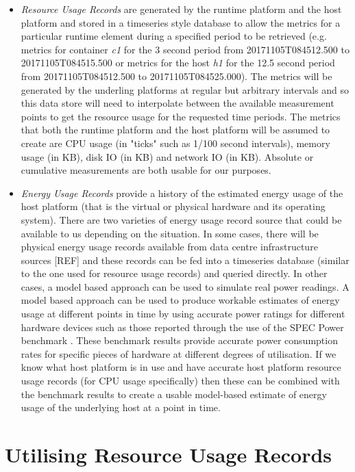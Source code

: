 \begin{itemize}
\item \emph{Resource Usage Records} are generated by the runtime platform and the host platform and stored in a timeseries style database to allow the metrics for a particular runtime element during a specified period to be retrieved (e.g. metrics for container \emph{c1} for the 3 second period from 20171105T084512.500 to 20171105T084515.500 or metrics for the host \emph{h1} for the 12.5 second period from 20171105T084512.500 to 20171105T084525.000).  The metrics will be generated by the underling platforms at regular but arbitrary intervals and so this data store will need to interpolate between the available measurement points to get the resource usage for the requested time periods.  The metrics that both the runtime platform and the host platform will be assumed to create are CPU usage (in "ticks" such as 1/100 second intervals), memory usage (in KB), disk IO (in KB) and network IO (in KB).  Absolute or cumulative measurements are both usable for our purposes.

\item \emph{Energy Usage Records} provide a history of the estimated energy usage of the host platform (that is the virtual or physical hardware and its operating system).  There are two varieties of energy usage record source that could be available to us depending on the situation.  In some cases, there will be physical energy usage records available from data centre infrastructure sources [REF] and these records can be fed into a timeseries database (similar to the one used for resource usage records) and queried directly.  In other cases, a model based approach can be used to simulate real power readings.  A model based approach can be used to produce workable estimates of energy usage at different points in time by using accurate power ratings for different hardware devices such as those reported through the use of the SPEC Power benchmark \cite{lange2009-specpower}.  These benchmark results provide accurate power consumption rates for specific pieces of hardware at different degrees of utilisation.  If we know what host platform is in use and have accurate host platform resource usage records (for CPU usage specifically) then these can be combined with the benchmark results to create a usable model-based estimate of energy usage of the underlying host at a point in time.

\end{itemize}

\section{Utilising Resource Usage Records}

